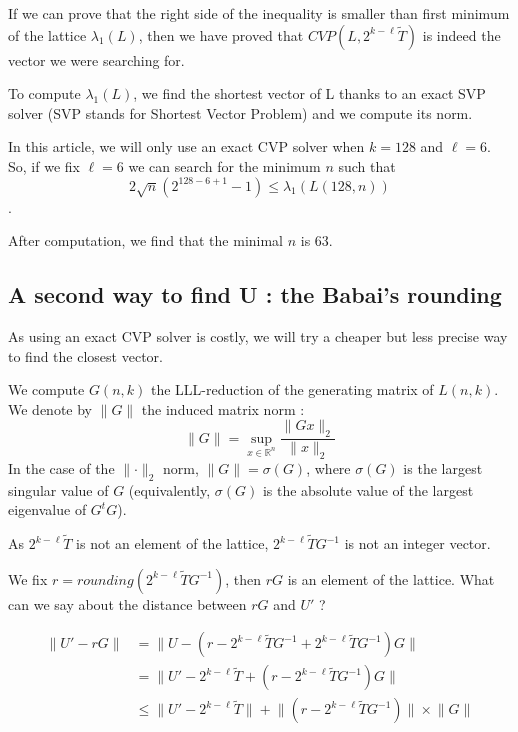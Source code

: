 \documentclass[submission,svgnames,journal=tosc]{iacrtrans}
\begin{document}
If we can prove that the right side of the inequality is smaller than first minimum of the lattice \(\lambda_1(L)\), then we have proved that \(CVP(L,2^{k-\ell}\widetilde{T})\) is indeed the vector we were searching for.

To compute \(\lambda_1(L)\), we find the shortest vector of L thanks to an exact SVP solver (SVP stands for Shortest Vector Problem) and we compute its norm.


In this article, we will only use an exact CVP solver when \(k = 128\) and \(\ell = 6\). So, if we fix \(\ell = 6\) we can search for the minimum \(n\) such that \[2\sqrt{n}(2^{128-6+1}-1) \leqslant \lambda_1(L(128,n))\].

After computation, we find that the minimal \(n\) is 63.


\subsection{A second way to find U : the Babai's rounding}

As using an exact CVP solver is costly, we will try a cheaper but less precise way to find the closest vector.

We compute \(G(n,k)\) the LLL-reduction of the generating matrix of \(L(n,k)\). We denote by  \(\rVert G \lVert\) the induced matrix norm :
\[\rVert G \lVert =  \sup_{x \in \mathbb{R}^n}\frac{\lVert Gx \rVert_2}{\lVert x \rVert_2}\]
In the case of the \(\lVert \cdot \rVert_2\) norm,
\(\rVert G \lVert = \sigma(G)\), where \(\sigma(G)\) is the largest singular
value of $G$ (equivalently, $\sigma(G)$ is the absolute value of the largest
eigenvalue of $G^{t} G$).


As \(2^{k-\ell}\widetilde{T}\) is not an element of the lattice, \(2^{k-\ell}\widetilde{T}G^{-1}\) is not an integer vector.

We fix \(r = rounding(2^{k-\ell}\widetilde{T}G^{-1}) \), then \(rG\) is an element of the lattice. What can we say about the distance between \(rG\) and \(U'\) ?

\begin{align*}
\lVert U' - rG \rVert &= \lVert U - (r-2^{k-\ell}\widetilde{T}G^{-1} + 2^{k-\ell}\widetilde{T}G^{-1})G \rVert\\
&= \lVert U' - 2^{k-\ell}\widetilde{T} + (r-2^{k-\ell}\widetilde{T}G^{-1})G \rVert\\
&\leqslant \lVert U' - 2^{k-\ell}\widetilde{T} \rVert + \lVert(r-2^{k-\ell}\widetilde{T}G^{-1})\rVert \times \lVert G\rVert\\	
\end{align*}
\end{document}
